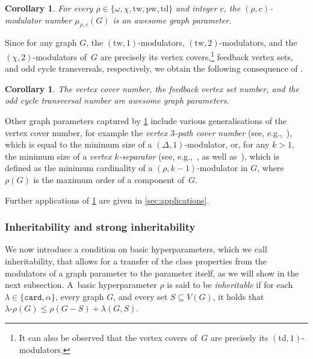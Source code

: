 \documentclass[11pt]{article}
\newcommand{\td}{\mathrm{td}}
\newcommand{\tw}{\mathrm{tw}}
\newcommand{\pw}{\mathrm{pw}}
\newcommand{\rhocm}{\mu_{\rho,c}}
\theoremstyle{plain}
\newtheorem{corollary}[theorem]{Corollary}
\theoremstyle{definition}
\theoremstyle{remark}
\numberwithin{equation}{section}
\begin{document}
\begin{corollary}\label{cor:modulator-examples}
For every $\rho\in\{\omega,\chi,\tw,\pw,\td\}$ and integer $c$, the $(\rho,c)$-modulator number $\rhocm(G)$ is an awesome graph parameter.
\end{corollary}

\begin{sloppypar}
Since for any graph $G$, the $(\tw,1)$-modulators, $(\tw,2)$-modulators, and the \hbox{$(\chi,2)$-modulators} of~$G$ are precisely its vertex covers,\footnote{It can also be observed that the vertex covers of~$G$ are precisely its $(\td,1)$-modulators.} feedback vertex sets, and odd cycle transversals, respectively, we obtain the following consequence of .
\end{sloppypar}

\begin{corollary}\label{cor:awesome-examples}
The vertex cover number, the feedback vertex set number, and the odd cycle transversal number are awesome graph parameters.
\end{corollary}

Other graph parameters captured by \cref{cor:modulator-examples} include various  generalisations of the vertex cover number, for example the \textsl{vertex $3$-path cover number} (see, e.g.,~\cite{MR3056999,MR2806015}), which is equal to the minimum size of a $(\Delta,1)$-modulator, or, for any $k>1$, the minimum size of a \textsl{vertex $k$-separator} (see, e.g.,~\cite{MR3987192}, as well as~\cite{MR4927577,MR3567632}), which is defined as the minimum cardinality of a $(\rho,k-1)$-modulator in $G$, where $\rho(G)$ is the maximum order of a component of~$G$.

Further applications of \cref{cor:modulator-examples} are given in \cref{sec:applications}.

\subsubsection{Inheritability and strong inheritability}

We now introduce a condition on basic hyperparameters, which we call inheritability, that allows for a transfer of the class properties from the modulators of a graph parameter to the parameter itself, as we will show in the next subsection.
A~basic hyperparameter $\rho$ is said to be \emph{inheritable} if for each $\lambda\in \{\mathtt{card},\alpha\}$, every graph $G$, and every set $S\subseteq V(G)$, it holds that $\lambda\text{-}\rho(G)\le \rho(G-S) + \lambda(G,S)$.
\end{document}
